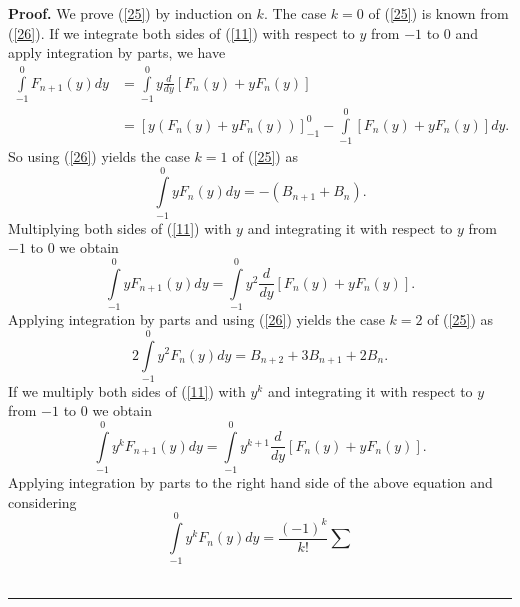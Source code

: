 \documentclass{article}%
\newenvironment{proof}[1][Proof]{\noindent\textbf{#1.} }{\ \rule{0.5em}{0.5em}}
\begin{document}
\begin{proof}
We prove (\ref{25}) by induction on $k.$ The case $k=0$ of (\ref{25}) is known
from (\ref{26}). If we integrate both sides of (\ref{11}) with respect to $y$
from $-1$ to $0$ and apply integration by parts, we have
\begin{align*}%
{\displaystyle\int\limits_{-1}^{0}}
F_{n+1}\left(  y\right)  dy  &  =%
{\displaystyle\int\limits_{-1}^{0}}
y\frac{d}{dy}\left[  F_{n}\left(  y\right)  +yF_{n}\left(  y\right)  \right]
\\
&  =\left[  y\left(  F_{n}\left(  y\right)  +yF_{n}\left(  y\right)  \right)
\right]  _{-1}^{0}-%
{\displaystyle\int\limits_{-1}^{0}}
\left[  F_{n}\left(  y\right)  +yF_{n}\left(  y\right)  \right]  dy.
\end{align*}
So using (\ref{26}) yields the case $k=1$ of (\ref{25}) as
\[%
{\displaystyle\int\limits_{-1}^{0}}
yF_{n}\left(  y\right)  dy=-\left(  B_{n+1}+B_{n}\right)  .
\]
Multiplying both sides of (\ref{11}) with $y$ and integrating it with respect
to $y$ from $-1$ to $0$ we obtain
\[%
{\displaystyle\int\limits_{-1}^{0}}
yF_{n+1}\left(  y\right)  dy=%
{\displaystyle\int\limits_{-1}^{0}}
y^{2}\frac{d}{dy}\left[  F_{n}\left(  y\right)  +yF_{n}\left(  y\right)
\right]  .
\]
Applying integration by parts and using (\ref{26}) yields the case $k=2$ of
(\ref{25}) as%
\[
2%
{\displaystyle\int\limits_{-1}^{0}}
y^{2}F_{n}\left(  y\right)  dy=B_{n+2}+3B_{n+1}+2B_{n}.
\]
If we multiply both sides of (\ref{11}) with $y^{k}$ and integrating it with
respect to $y$ from $-1$ to $0$ we obtain
\[%
{\displaystyle\int\limits_{-1}^{0}}
y^{k}F_{n+1}\left(  y\right)  dy=%
{\displaystyle\int\limits_{-1}^{0}}
y^{k+1}\frac{d}{dy}\left[  F_{n}\left(  y\right)  +yF_{n}\left(  y\right)
\right]  .
\]
Applying integration by parts to the right hand side of the above equation and
considering%
\[%
{\displaystyle\int\limits_{-1}^{0}}
y^{k}F_{n}\left(  y\right)  dy=\frac{\left(  -1\right)  ^{k}}{k!}\sum
\]
\end{proof}
\end{document}
